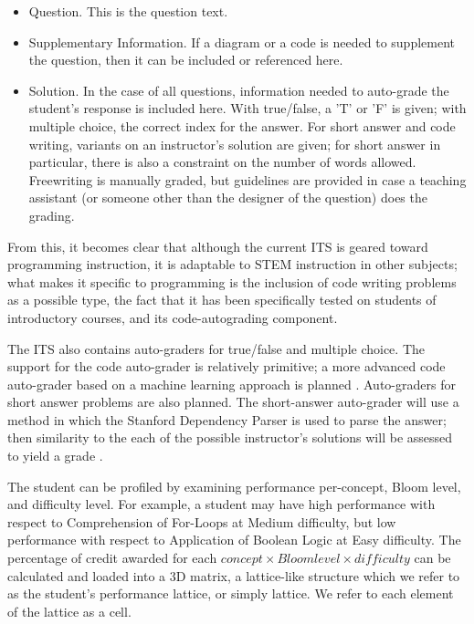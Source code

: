 \documentclass[hidelinks,11pt]{article}
\begin{document}
\begin{itemize}
   \item Question.  This is the question text.

   \item Supplementary Information.  If a diagram or a code is needed to
   supplement the question, then it can be included or referenced here. 

   \item Solution.  In the case of all questions, information needed to auto-grade
   the student's response is included here. With true/false, a 'T' or 'F' is
   given; with multiple choice, the correct index for the answer.  For short
   answer and code writing, variants on an instructor's solution are given; for
   short answer in particular, there is also a constraint on the number of words
   allowed.  Freewriting is manually graded, but guidelines are provided in case a
   teaching assistant (or someone other than the designer of the question) does
   the grading.

\end{itemize}

From this, it becomes clear that although the current ITS is geared toward
programming instruction, it is adaptable to STEM instruction in other subjects;
what makes it specific to programming is the inclusion of code writing problems
as a possible type, the fact that it has been specifically tested on
students of introductory courses, and its code-autograding component.

The ITS also contains auto-graders for true/false and multiple choice.  The
support for the code auto-grader is relatively primitive; a more advanced code
auto-grader based on a machine learning approach is planned
{\citep{shashank2014}}. Auto-graders for short answer problems are also planned.
The short-answer auto-grader will use a method in which the Stanford Dependency
Parser is used to parse the answer; then similarity to the each of the possible
instructor's solutions will be assessed to yield a grade {\citep{mohler2011}}. 

The student can be profiled by examining performance per-concept, Bloom level,
and difficulty level.  For example, a student may have high performance with
respect to Comprehension of For-Loops at Medium difficulty, but low performance
with respect to Application of Boolean Logic at Easy difficulty.  The
percentage of credit awarded for each $concept \times Bloom level \times
difficulty$ can be calculated and loaded into a 3D matrix, a lattice-like
structure which we refer to as the student's performance lattice, or simply
lattice. We refer to each element of the lattice as a cell.
\end{document}
